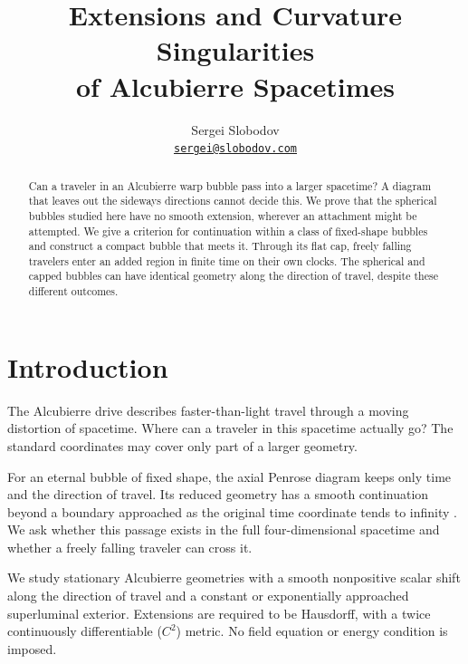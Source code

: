 \documentclass[10pt]{article}
\begin{document}
\title{Extensions and Curvature Singularities\\
of Alcubierre Spacetimes}

\author{Sergei Slobodov\\
  \href{mailto:sergei@slobodov.com}{\texttt{sergei@slobodov.com}}}

\date{}

\maketitle

\begin{abstract}
Can a traveler in an Alcubierre warp bubble pass into a larger spacetime?
A diagram that leaves out the sideways directions cannot decide this.
We prove that the spherical bubbles studied here have no smooth extension,
wherever an attachment might be attempted.  We give a criterion for
continuation within a class of fixed-shape bubbles and construct a compact
bubble that meets it.  Through its flat cap, freely falling travelers enter
an added region in finite time on their own clocks.  The spherical and
capped bubbles can have identical geometry along the direction of travel,
despite these different outcomes.
\end{abstract}

\section{Introduction}

The Alcubierre drive \cite{Alcubierre1994} describes faster-than-light travel
through a moving distortion of spacetime.  Where can a traveler in this
spacetime actually go?  The standard coordinates may cover only part of a
larger geometry.

For an eternal bubble of fixed shape, the axial Penrose diagram keeps only
time and the direction of travel.  Its reduced geometry has a smooth
continuation beyond a boundary approached as the original time coordinate
tends to infinity \cite{FinazziLiberatiBarcelo2009,BarceloEtAl2022}.  We ask
whether this passage exists in the full four-dimensional spacetime and
whether a freely falling traveler can cross it.

We study stationary Alcubierre geometries with a smooth nonpositive scalar
shift along the direction of travel and a constant or exponentially
approached superluminal exterior.  Extensions are required to be Hausdorff,
with a twice continuously differentiable (\(C^2\)) metric.  No field equation
or energy condition is imposed.
\end{document}
